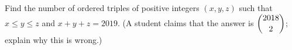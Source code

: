 Find the number of ordered triples of positive integers $(x,y,z)$ such that $x\le y\le z$ and $x+y+z=2019$. (A student claims that the answer is $\dbinom{2018}{2}$; explain why this is wrong.)
